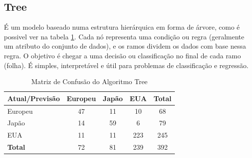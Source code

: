 \documentclass[conference]{IEEEtran}
\begin{document}
\subsection{Tree}
É um modelo baseado numa estrutura hierárquica em forma de árvore, como é possivel ver na tabela \ref{tab:conf_matrix_tree}.
Cada nó representa uma condição ou regra (geralmente um atributo do conjunto de dados), e os ramos dividem os dados com base
nessa regra. O objetivo é chegar a uma decisão ou classificação no final de cada ramo (folha). É simples, interpretável e
útil para problemas de classificação e regressão.
\begin{table}[!ht]
	\centering
	\begin{tabular}{lcccc}
		\toprule
		\textbf{Atual/Previsão} & \textbf{Europeu} & \textbf{Japão} & \textbf{EUA} & \textbf{Total} \\
		\midrule
		Europeu                 & 47               & 11             & 10           & 68             \\
		Japão                   & 14               & 59             & 6            & 79             \\
		EUA                     & 11               & 11             & 223          & 245            \\
		\midrule
		\textbf{Total}          & 72               & 81             & 239          & 392            \\
		\bottomrule
	\end{tabular}
	\label{tab:conf_matrix_tree}
	\caption{Matriz de Confusão do Algoritmo Tree}
\end{table}

\end{document}

